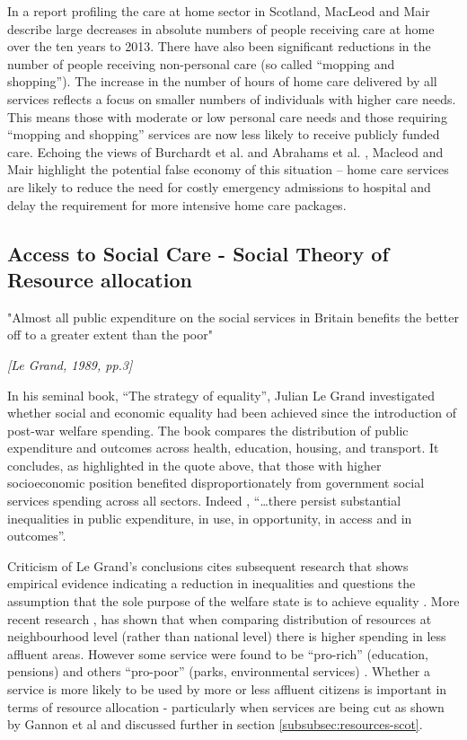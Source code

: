 \documentclass[12pt,]{report}
\begin{document}
In a report profiling the care at home sector in Scotland, MacLeod and
Mair \citeyearpar{RN147} describe large decreases in absolute numbers of
people receiving care at home over the ten years to 2013. There have
also been significant reductions in the number of people receiving
non-personal care (so called ``mopping and shopping''). The increase in
the number of hours of home care delivered by all services reflects a
focus on smaller numbers of individuals with higher care needs. This
means those with moderate or low personal care needs and those requiring
``mopping and shopping'' services are now less likely to receive
publicly funded care. Echoing the views of Burchardt et al.
\citeyearpar{RN173} and Abrahams et al. \citeyearpar{RN177}, Macleod and
Mair \citeyearpar{RN147} highlight the potential false economy of this
situation -- home care services are likely to reduce the need for costly
emergency admissions to hospital and delay the requirement for more
intensive home care packages.

\subsection{Access to Social Care - Social Theory of Resource allocation}\label{subsubsec:theory-resources}

\epigraph{"Almost all public expenditure on the social services in Britain benefits the better off to a greater extent than the poor"}{\textit{[Le Grand, 1989, pp.3]}}

In his seminal book, ``The strategy of equality'', Julian Le Grand
\citeyearpar{RN175} investigated whether social and economic equality
had been achieved since the introduction of post-war welfare spending.
The book compares the distribution of public expenditure and outcomes
across health, education, housing, and transport. It concludes, as
highlighted in the quote above, that those with higher socioeconomic
position benefited disproportionately from government social services
spending across all sectors. Indeed , ``\ldots{}there persist
substantial inequalities in public expenditure, in use, in opportunity,
in access and in outcomes''\citep[pp.4]{RN175}.

Criticism of Le Grand's conclusions cites subsequent research that shows
empirical evidence indicating a reduction in inequalities and questions
the assumption that the sole purpose of the welfare state is to achieve
equality \citep{RN113}. More recent research \citetext{\citealp[ cited
in]{RN440}; \citealp{RN116}},\citep{RN441, RN115} has shown that when
comparing distribution of resources at neighbourhood level (rather than
national level) there is higher spending in less affluent areas. However
some service were found to be ``pro-rich'' (education, pensions) and
others ``pro-poor'' (parks, environmental services) \citetext{\citealp[
cited in]{RN440}; \citealp{RN116}}. Whether a service is more likely to
be used by more or less affluent citizens is important in terms of
resource allocation - particularly when services are being cut as shown
by Gannon et al \citeyearpar{RN235} and discussed further in section
\ref{subsubsec:resources-scot}.
\end{document}
